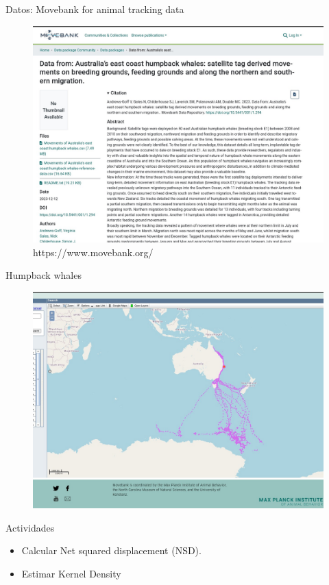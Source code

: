 \documentclass[11pt]{beamer}
\begin{document}
\begin{frame}{Datos: Movebank for animal tracking data}
	\begin{figure}
		\includegraphics[scale=0.2]{images/losdatos}
		\caption{https://www.movebank.org/}
	\end{figure}
\end{frame}

\begin{frame}{Humpback whales}
	\begin{figure}
		\includegraphics[scale=0.23]{images/elmovimiento}
	\end{figure}
\end{frame}

\begin{frame}{Actividades}
	\begin{itemize}
		\item Calcular Net squared displacement (NSD).
		\item Estimar Kernel Density
	\end{itemize}
\end{frame}
\end{document}
